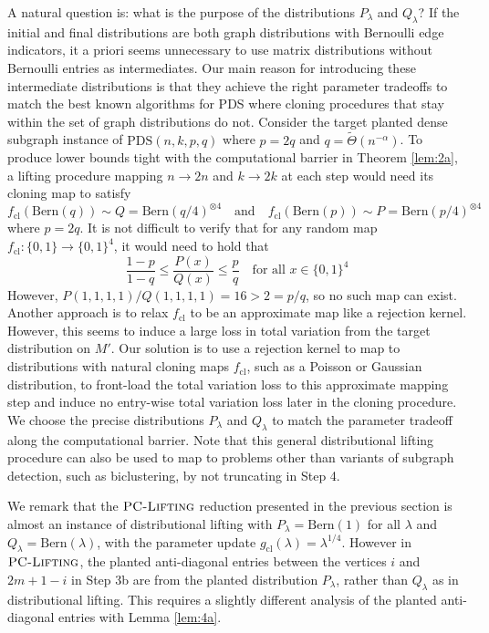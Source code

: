 A natural question is: what is the purpose of the distributions $P_{\lambda}$ and $Q_{\lambda}$? If the initial and final distributions are both graph distributions with Bernoulli edge indicators, it a priori seems unnecessary to use matrix distributions without Bernoulli entries as intermediates. Our main reason for introducing these intermediate distributions is that they achieve the right parameter tradeoffs to match the best known algorithms for PDS where cloning procedures that stay within the set of graph distributions do not. Consider the target planted dense subgraph instance of $\text{PDS}(n, k, p, q)$ where $p = 2 q$ and $q = \tilde{\Theta}(n^{-\alpha})$. To produce lower bounds tight with the computational barrier in Theorem \ref{lem:2a}, a lifting procedure mapping $n \to 2n$ and $k \to 2k$ at each step would need its cloning map to satisfy
$$f_{\text{cl}}(\text{Bern}(q)) \sim Q = \text{Bern}(q/4)^{\otimes 4} \quad \text{and} \quad f_{\text{cl}}(\text{Bern}(p)) \sim P = \text{Bern}(p/4)^{\otimes 4}$$
where $p = 2q$. It is not difficult to verify that for any random map $f_{\text{cl}} : \{0, 1\} \to \{0, 1\}^4$, it would need to hold that
$$\frac{1 - p}{1 - q} \le \frac{P(x)}{Q(x)} \le \frac{p}{q} \quad \text{for all } x \in \{0, 1\}^4$$
However, $P(1, 1, 1, 1)/Q(1, 1, 1, 1) = 16 > 2 = p/q$, so no such map can exist. Another approach is to relax $f_{\text{cl}}$ to be an approximate map like a rejection kernel. However, this seems to induce a large loss in total variation from the target distribution on $M'$. Our solution is to use a rejection kernel to map to distributions with natural cloning maps $f_{\text{cl}}$, such as a Poisson or Gaussian distribution, to front-load the total variation loss to this approximate mapping step and induce no entry-wise total variation loss later in the cloning procedure. We choose the precise distributions $P_{\lambda}$ and $Q_{\lambda}$ to match the parameter tradeoff along the computational barrier. Note that this general distributional lifting procedure can also be used to map to problems other than variants of subgraph detection, such as biclustering, by not truncating in Step 4.

We remark that the $\textsc{PC-Lifting}$ reduction presented in the previous section is almost an instance of distributional lifting with $P_{\lambda} = \text{Bern}(1)$ for all $\lambda$ and $Q_{\lambda} = \text{Bern}(\lambda)$, with the parameter update $g_{\text{cl}}(\lambda) = \lambda^{1/4}$. However in $\textsc{PC-Lifting}$, the planted anti-diagonal entries between the vertices $i$ and $2m + 1 - i$ in Step 3b are from the planted distribution $P_\lambda$, rather than $Q_\lambda$ as in distributional lifting. This requires a slightly different analysis of the planted anti-diagonal entries with Lemma \ref{lem:4a}.

